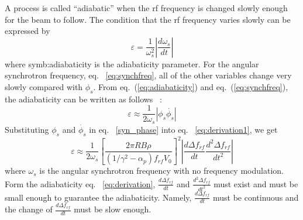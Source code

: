 \begin{itemize}
A process is called “adiabatic” when the rf frequency is changed slowly enough for the beam to follow. The condition that the rf frequency varies slowly can be expressed by 
\begin{equation}
\varepsilon=\frac{1}{\omega_s^2}|\frac{d\omega_s}{dt}|
\label{eq:adiabaticity}
\end{equation} 
where \gls{symb:adiabaticity} is the adiabaticity parameter. For the angular synchrotron frequency, eq. ~\ref{eq:synchfreq}, all of the other variables change very slowly compared with $\phi_s$. From eq.~(\ref{eq:adiabaticity}) and eq.~(\ref{eq:synchfreq}), the adiabaticity can be written as follows ~\cite{ezura_beam-dynamics_2008}:
\begin{equation}
\varepsilon \approx \frac{1}{2\omega_s}|\phi_s\dot{\phi_{s}}|
\label{eq:derivation1}
\end{equation} 
Substituting $\phi_{s}$ and $\dot{\phi_{s}}$ in eq. ~\ref{syn_phase} into eq. ~\ref{eq:derivation1}, we get
\begin{equation}
\varepsilon \approx \frac{1}{2\omega_s}[\frac{2\pi R B\rho}{(1/\gamma^2-\alpha_p)f_\mathit{rf}V_0}]^2|\frac{d \Delta f_\mathit{rf}}{dt}\frac{d^2\Delta f_{\mathit{rf}}}{dt^2}|
\label{eq:derivation}
\end{equation} 
where $\omega_s$ is the angular synchrotron frequency with no frequency modulation. Form the adiabaticity eq. ~\ref{eq:derivation}, $\frac{d\Delta f_{\mathit{rf}}}{dt}$ and $\frac{d^2\Delta f_{\mathit{rf}}}{dt^2}$ must exist and must be small enough to guarantee the adiabaticity. Namely, $\frac{d\Delta f_{\mathit{rf}}}{dt}$ must be continuous and the change of $\frac{d\Delta f_{\mathit{rf}}}{dt}$ must be slow enough. 

%
%



\end{itemize}
